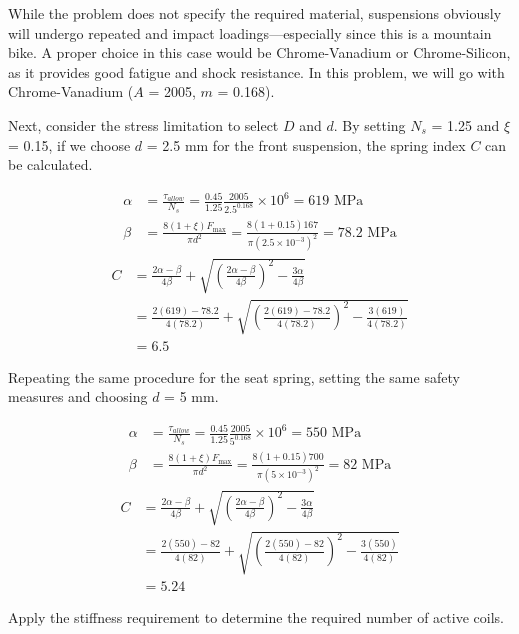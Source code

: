 \documentclass[a4paper,openany,12pt]{book}
\begin{document}
{{While the problem does not specify the required material, suspensions
obviously will undergo repeated and impact loadings---especially since
this is a mountain bike. A proper choice in this case would be
Chrome-Vanadium or Chrome-Silicon, as it provides good fatigue and shock
resistance. In this problem, we will go with Chrome-Vanadium (\(A\) =
2005, \(m\) = 0.168).

Next, consider the stress limitation to select \(D\) and \(d\). By setting
\(N_s\) = 1.25 and \(\xi\) = 0.15, if we choose \(d\) = 2.5 mm for the front
suspension, the spring index \(C\) can be calculated.

$$\begin{aligned}
    \alpha  &= \frac{\tau _{allow}}{N_s} = \frac{0.45}{1.25}\frac{2005}{2.5^{0.168}} \times 10^6 = 619 \text{ MPa} \\ 
    \beta  &= \frac{8(1 + \xi )F_{\max}}{\pi d^2} = \frac{8(1 + 0.15)167}{\pi (2.5 \times 10^{-3})^2} = 78.2 \text{ MPa}
  \end{aligned}$$ $$\begin{aligned}
    C &= \frac{2\alpha  - \beta}{4\beta} + \sqrt {\left( \frac{2\alpha  - \beta}{4\beta} \right)^2 - \frac{3\alpha}{4\beta}}  \\ 
      & = \frac{2(619) - 78.2}{4(78.2)} + \sqrt {\left( \frac{2(619) - 78.2}{4(78.2)} \right)^2 - \frac{3(619)}{4(78.2)}}  \\ 
      &= 6.5 
  \end{aligned}$$

Repeating the same procedure for the seat spring, setting the same
safety measures and choosing \(d\) = 5 mm.

$$\begin{aligned}
    \alpha &= \frac{\tau_{allow}}{N_s} = \frac{0.45}{1.25}\frac{2005}{5^{0.168}} \times 10^6 = 550\text{ MPa} \\ 
    \beta &= \frac{8(1 + \xi )F_{\max}}{\pi d^2} = \frac{8(1 + 0.15)700}{\pi (5 \times 10^{-3})^2} = 82\text{ MPa}
  \end{aligned}$$ $$\begin{aligned}
    C &= \frac{2\alpha  - \beta}{4\beta} + \sqrt {\left( \frac{2\alpha  - \beta}{4\beta} \right)^2 - \frac{3\alpha}{4\beta}}  \\ 
      &= \frac{2(550) - 82}{4(82)} + \sqrt {\left( \frac{2(550) - 82}{4(82)} \right)^2 - \frac{3(550)}{4(82)}}  \\ 
      &= 5.24
  \end{aligned}$$

Apply the stiffness requirement to determine the required number of
active coils.

}}
\end{document}
